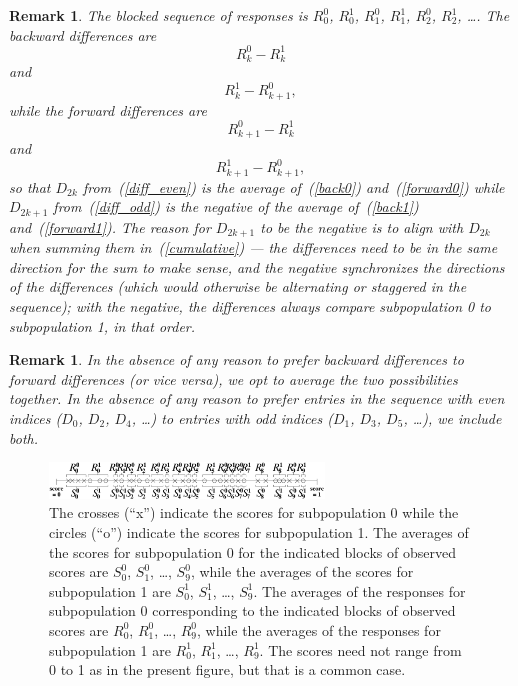 \documentclass{article}
\newtheorem{remark1}[theorem]{Remark}
\newenvironment{remark}{\begin{remark1} \rm}{\end{remark1}}
\begin{document}
\begin{remark}
The blocked sequence of responses is
$R^0_0$, $R^1_0$, $R^0_1$, $R^1_1$, $R^0_2$, $R^1_2$, \dots.
The backward differences are
%
\begin{equation}
\label{back0}
R^0_k - R^1_k
\end{equation}
%
and
%
\begin{equation}
\label{back1}
R^1_k - R^0_{k+1},
\end{equation}
%
while the forward differences are
%
\begin{equation}
\label{forward0}
R^0_{k+1} - R^1_k
\end{equation}
%
and
%
\begin{equation}
\label{forward1}
R^1_{k+1} - R^0_{k+1},
\end{equation}
%
so that $D_{2k}$ from~(\ref{diff_even}) is the average of~(\ref{back0})
and~(\ref{forward0}) while $D_{2k+1}$ from~(\ref{diff_odd}) is the negative
of the average of~(\ref{back1}) and~(\ref{forward1}).
The reason for $D_{2k+1}$ to be the negative
is to align with $D_{2k}$ when summing them in~(\ref{cumulative})
--- the differences need to be in the same direction for the sum to make sense,
and the negative synchronizes the directions of the differences
(which would otherwise be alternating or staggered in the sequence);
with the negative, the differences always compare
subpopulation 0 to subpopulation 1, in that order.
\end{remark}

\begin{remark}
In the absence of any reason to prefer backward differences
to forward differences (or vice versa),
we opt to average the two possibilities together.
In the absence of any reason to prefer entries in the sequence
with even indices ($D_0$, $D_2$, $D_4$, \dots) to entries with odd indices
($D_1$, $D_3$, $D_5$, \dots), we include both.
\end{remark}


\begin{figure}
\begin{centering}
\hfil\parbox{0.65\textwidth}
{\includegraphics[width=0.65\textwidth]{./figures/partition.pdf}}
\end{centering}
\caption{The crosses (``x'') indicate the scores for subpopulation 0
while the circles (``o'') indicate the scores for subpopulation 1.
The averages of the scores for subpopulation 0 for the indicated blocks
of observed scores are $S^0_0$, $S^0_1$, \dots, $S^0_9$,
while the averages of the scores for subpopulation 1 are
$S^1_0$, $S^1_1$, \dots, $S^1_9$.
The averages of the responses for subpopulation 0 corresponding
to the indicated blocks of observed scores are
$R^0_0$, $R^0_1$, \dots, $R^0_9$, while the averages of the responses
for subpopulation 1 are $R^1_0$, $R^1_1$, \dots, $R^1_9$.
The scores need not range from 0 to 1 as in the present figure,
but that is a common case.
}
\label{partition}
\end{figure}
\end{document}
